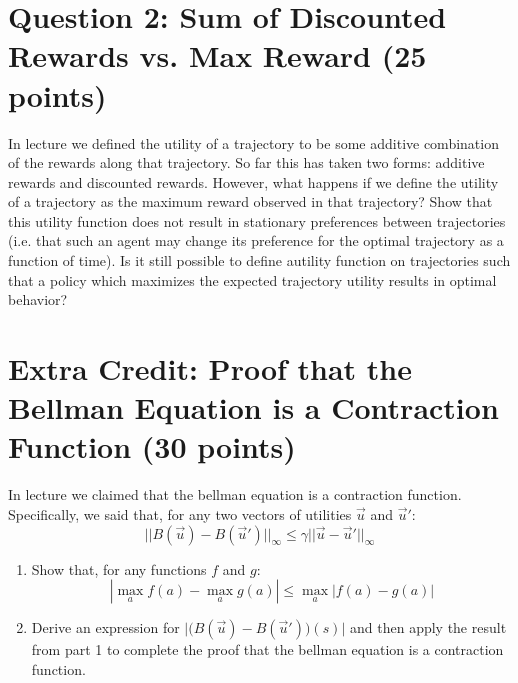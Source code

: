 \documentclass[11pt]{article}
\newcommand{\question}[1]{\section*{\normalsize #1}}
\begin{document}
\question{Question 2: Sum of Discounted Rewards vs. Max Reward (25 points)}
In lecture we defined the utility of a trajectory to be some additive combination of the rewards along that trajectory. So far this has taken two forms: additive rewards and discounted rewards. However, what happens if we define the utility of a trajectory as the maximum reward observed in that trajectory? Show that this utility function does not result in stationary preferences between trajectories (i.e. that such an agent may change its preference for the optimal trajectory as a function of time). Is it still possible to define autility function on trajectories such that a policy which maximizes the expected trajectory utility results in optimal behavior?
\newpage





\question{Extra Credit: Proof that the Bellman Equation is a Contraction Function (30 points)}
In lecture we claimed that the bellman equation is a contraction function. Specifically, we said that, for any two vectors of utilities $\vec{u}$ and $\vec{u}'$:
$$||B(\vec{u}) - B(\vec{u}')||_{\infty} \le \gamma||\vec{u} - \vec{u}'||_{\infty}$$
\begin{enumerate}
    \item Show that, for any functions $f$ and $g$:
$$|\max\limits_{a} f(a) - \max\limits_{a} g(a)| \le \max\limits_{a} |f(a) - g(a)|$$
    \item Derive an expression for $\Big|\Big(B(\vec{u}) - B(\vec{u}')\Big)(s)\Big|$ and then apply the result from part 1 to complete the proof that the bellman equation is a contraction function.
\end{enumerate}
\newpage
\end{document}
